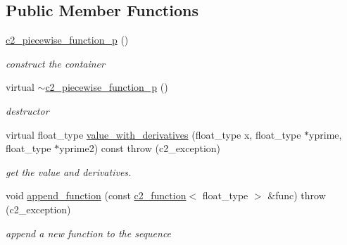 \subsection*{Public Member Functions}
\begin{DoxyCompactItemize}
\item 
\hypertarget{classc2__piecewise__function__p_af97c8865a492b191be0d25146efd17e0}{\hyperlink{classc2__piecewise__function__p_af97c8865a492b191be0d25146efd17e0}{c2\-\_\-piecewise\-\_\-function\-\_\-p} ()}\label{classc2__piecewise__function__p_af97c8865a492b191be0d25146efd17e0}

\begin{DoxyCompactList}\small\item\em construct the container \end{DoxyCompactList}\item 
\hypertarget{classc2__piecewise__function__p_ae4568a15bc298e69a25d1b05a25a3c1f}{virtual \hyperlink{classc2__piecewise__function__p_ae4568a15bc298e69a25d1b05a25a3c1f}{$\sim$c2\-\_\-piecewise\-\_\-function\-\_\-p} ()}\label{classc2__piecewise__function__p_ae4568a15bc298e69a25d1b05a25a3c1f}

\begin{DoxyCompactList}\small\item\em destructor \end{DoxyCompactList}\item 
virtual float\-\_\-type \hyperlink{classc2__piecewise__function__p_a24dda73e84778fa9eb2160195403c45f}{value\-\_\-with\-\_\-derivatives} (float\-\_\-type x, float\-\_\-type $\ast$yprime, float\-\_\-type $\ast$yprime2) const   throw (c2\-\_\-exception)
\begin{DoxyCompactList}\small\item\em get the value and derivatives. \end{DoxyCompactList}\item 
void \hyperlink{classc2__piecewise__function__p_accaab7a03beef73ee88d6cfed30f52df}{append\-\_\-function} (const \hyperlink{classc2__function}{c2\-\_\-function}$<$ float\-\_\-type $>$ \&func)  throw (c2\-\_\-exception)
\begin{DoxyCompactList}\small\item\em append a new function to the sequence \end{DoxyCompactList}\end{DoxyCompactItemize}
